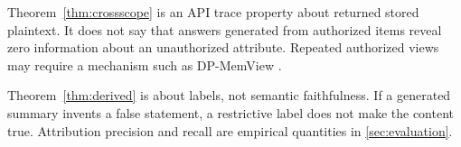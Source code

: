 \begin{remark}
Theorem~\ref{thm:crossscope} is an API trace property about returned stored plaintext. It does not say that answers generated from authorized items reveal zero information about an unauthorized attribute. Repeated authorized views may require a mechanism such as DP-MemView \citep{kim2026dpmemview}.
\end{remark}

\begin{remark}
Theorem~\ref{thm:derived} is about labels, not semantic faithfulness. If a generated summary invents a false statement, a restrictive label does not make the content true. Attribution precision and recall are empirical quantities in \cref{sec:evaluation}.
\end{remark}


